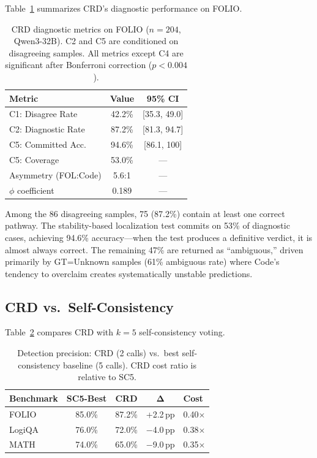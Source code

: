 \documentclass[11pt,a4paper]{article}
\newcommand{\method}{CRD}
\newcommand{\pp}{\,pp}
\begin{document}
Table~\ref{tab:main} summarizes \method{}'s diagnostic performance on FOLIO.

\begin{table}[t]
\centering
\small
\begin{tabular}{lcc}
\toprule
\textbf{Metric} & \textbf{Value} & \textbf{95\% CI} \\
\midrule
C1: Disagree Rate & 42.2\% & [35.3, 49.0] \\
C2: Diagnostic Rate & 87.2\% & [81.3, 94.7] \\
C5: Committed Acc. & 94.6\% & [86.1, 100] \\
C5: Coverage & 53.0\% & --- \\
Asymmetry (FOL:Code) & 5.6:1 & --- \\
$\phi$ coefficient & 0.189 & --- \\
\bottomrule
\end{tabular}
\caption{CRD diagnostic metrics on FOLIO ($n{=}204$, Qwen3-32B). C2 and C5 are conditioned on disagreeing samples. All metrics except C4 are significant after Bonferroni correction ($p{<}0.004$).}
\label{tab:main}
\end{table}

Among the 86 disagreeing samples, 75 (87.2\%) contain at least one correct pathway.
The stability-based localization test commits on 53\% of diagnostic cases, achieving 94.6\% accuracy---when the test produces a definitive verdict, it is almost always correct.
The remaining 47\% are returned as ``ambiguous,'' driven primarily by GT=Unknown samples (61\% ambiguous rate) where Code's tendency to overclaim creates systematically unstable predictions.

\subsection{CRD vs.\ Self-Consistency}
\label{sec:sc-comparison}

Table~\ref{tab:sc} compares \method{} with $k{=}5$ self-consistency voting.

\begin{table}[t]
\centering
\small
\begin{tabular}{lcccl}
\toprule
\textbf{Benchmark} & \textbf{SC5-Best} & \textbf{CRD} & $\boldsymbol{\Delta}$ & \textbf{Cost} \\
\midrule
FOLIO & 85.0\% & 87.2\% & +2.2\pp{} & 0.40$\times$ \\
LogiQA & 76.0\% & 72.0\% & $-$4.0\pp{} & 0.38$\times$ \\
MATH & 74.0\% & 65.0\% & $-$9.0\pp{} & 0.35$\times$ \\
\bottomrule
\end{tabular}
\caption{Detection precision: CRD (2 calls) vs.\ best self-consistency baseline (5 calls). CRD cost ratio is relative to SC5.}
\label{tab:sc}
\end{table}
\end{document}
